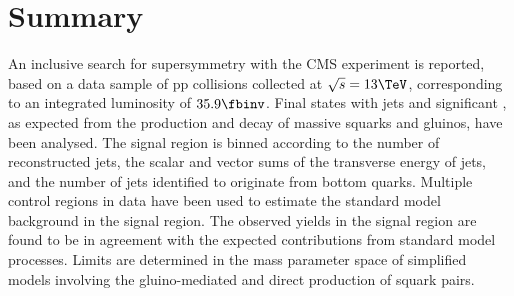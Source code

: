 \section{Summary}
\label{sec:summary}

An inclusive search for supersymmetry with the CMS experiment is
reported, based on a data sample of pp collisions collected at
$\sqrt{s} = 13\TeV$, corresponding to an integrated luminosity of
$35.9\fbinv$.  Final states with jets and significant \met, as
expected from the production and decay of massive squarks and gluinos,
have been analysed.  The signal region is binned according to the
number of reconstructed jets, the scalar and vector sums of the
transverse energy of jets, and the number of jets identified to
originate from bottom quarks.  Multiple control regions in data have
been used to estimate the standard model background in the signal
region.  The observed yields in the signal region are found to be in
agreement with the expected contributions from standard model
processes. Limits are determined in the mass parameter space of
simplified models involving the gluino-mediated and direct production
of squark pairs.  

